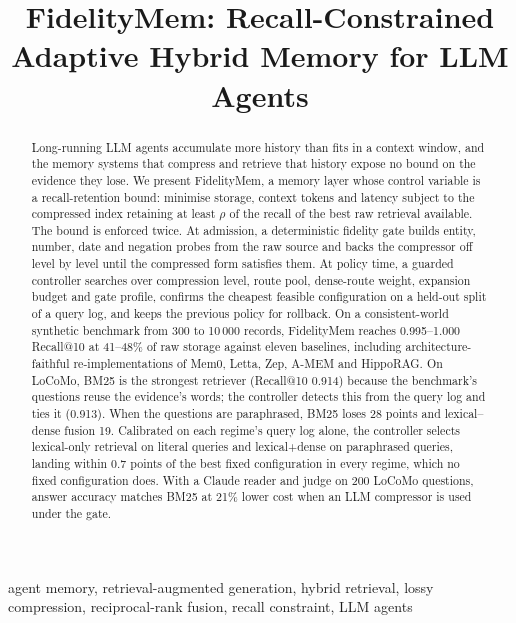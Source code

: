 \documentclass[conference]{IEEEtran}
\begin{document}
\title{FidelityMem: Recall-Constrained Adaptive Hybrid Memory for LLM Agents}

\author{
}

\maketitle

\begin{abstract}
Long-running LLM agents accumulate more history than fits in a context window, and the memory systems that compress and retrieve that history expose no bound on the evidence they lose. We present FidelityMem, a memory layer whose control variable is a recall-retention bound: minimise storage, context tokens and latency subject to the compressed index retaining at least $\rho$ of the recall of the best raw retrieval available. The bound is enforced twice. At admission, a deterministic fidelity gate builds entity, number, date and negation probes from the raw source and backs the compressor off level by level until the compressed form satisfies them. At policy time, a guarded controller searches over compression level, route pool, dense-route weight, expansion budget and gate profile, confirms the cheapest feasible configuration on a held-out split of a query log, and keeps the previous policy for rollback. On a consistent-world synthetic benchmark from 300 to 10\,000 records, FidelityMem reaches 0.995--1.000 Recall@10 at 41--48\% of raw storage against eleven baselines, including architecture-faithful re-implementations of Mem0, Letta, Zep, A-MEM and HippoRAG. On LoCoMo, BM25 is the strongest retriever (Recall@10 0.914) because the benchmark's questions reuse the evidence's words; the controller detects this from the query log and ties it (0.913). When the questions are paraphrased, BM25 loses 28 points and lexical--dense fusion 19. Calibrated on each regime's query log alone, the controller selects lexical-only retrieval on literal queries and lexical+dense on paraphrased queries, landing within 0.7 points of the best fixed configuration in every regime, which no fixed configuration does. With a Claude reader and judge on 200 LoCoMo questions, answer accuracy matches BM25 at 21\% lower cost when an LLM compressor is used under the gate.
\end{abstract}

\begin{IEEEkeywords}
agent memory, retrieval-augmented generation, hybrid retrieval, lossy compression, reciprocal-rank fusion, recall constraint, LLM agents
\end{IEEEkeywords}
\end{document}
